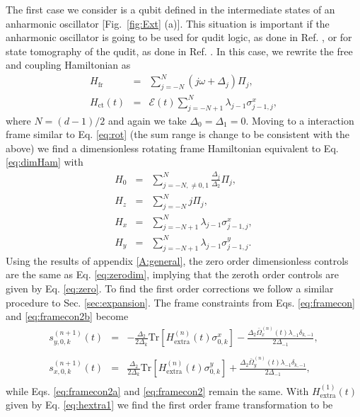 \documentclass[pra,twocolumn,floatfix,superscriptaddress,eqsecnum]{revtex4-1}
\begin{document}
The first case we consider is a qubit defined in the intermediate states of an anharmonic oscillator [Fig.~\ref{fig:Ext} (a)].
This situation is important if the anharmonic oscillator is going to be used for qudit logic, as done in Ref. \cite{Neeley2009}, or for state tomography of the qudit, as done in Ref. \cite{Bianchetti2010}.
In this case, we rewrite the free and coupling Hamiltonian as
\begin{eqnarray}
    H_\mathrm{fr}&=&\sum_{j=-N}^{N}(j\omega+\Delta_j)\Pi_j,\\
H_\mathrm{ct}(t)&=&\mathcal{E}(t)\sum_{j=-N+1}^{N}\lambda_{j-1}\sigma^x_{j-1,j},
\label{eq:hamiltonianB}\end{eqnarray} where $N=(d-1)/2$ and again we take $\Delta_0=\Delta_1=0$. Moving to a interaction frame similar to Eq. \eqref{eq:rot} (the sum range is change to be consistent with  the above) we find a dimensionless rotating frame Hamiltonian equivalent to Eq. \eqref{eq:dimHam} with
\begin{eqnarray}
H_0 &=& \sum_{j=-N,\neq0,1}^{N} \frac{\Delta_j}{\Delta_2}\Pi_j,\\
H_z &=& \sum_{j=-N}^{N}j \Pi_j,\\
H_x &=& \sum_{j=-N+1}^{N}\lambda_{j-1} \sigma_{j-1,j}^x, \\
H_y &=& \sum_{j=-N+1}^{N} \lambda_{j-1} \sigma_{j-1,j}^y.
\end{eqnarray}
Using the results of appendix \ref{A:general}, the zero order dimensionless controls are the same as Eq. \eqref{eq:zerodim}, implying that the zeroth order controls are given by Eq. \eqref{eq:zero}.  To find the first order corrections we follow a similar procedure to Sec. \ref{sec:expansion}. The frame constraints from Eqs. \eqref{eq:framecon} and \eqref{eq:framecon2b}  become
\begin{eqnarray}
 s^{(n+1)}_{y,0,k}(t)&=&-\frac{\Delta_2}{2 \Delta_k}\mathrm{Tr}[{H}_\mathrm{extra}^{(n)}(t) \sigma^x_{0,k}]-\frac{\Delta_2\bar\Omega_x^{(n)}(t)\lambda_{-1}\delta_{k,-1}}{2\Delta_{-1}},\nonumber\\\\
s^{(n+1)}_{x,0,k}(t)&=&\frac{\Delta_2}{2 \Delta_k}\mathrm{Tr}[{H}_\mathrm{extra}^{(n)} (t)\sigma^y_{0,k}]+\frac{\Delta_2\bar\Omega_y^{(n)}(t)\lambda_{-1}\delta_{k,-1}}{2\Delta_{-1}},\nonumber\\
\end{eqnarray} while Eqs. \eqref{eq:framecon2a} and \eqref{eq:framecon2} remain the same.
With  $H_\mathrm{extra}^{(1)}(t)$ given by Eq. \eqref{eq:hextra1} we find the first order frame transformation to be
\end{document}
